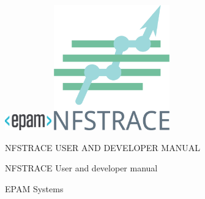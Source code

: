 \documentclass{article}
\begin{document}

\begin{titlepage}

\newcommand{\HRule}{\rule{\linewidth}{0.5mm}} %

\includegraphics[width=2cm]{pictures/epam-logo.png}
\newline
\center
\vspace{3cm}
\includegraphics[width=5cm]{pictures/logo.png}

\par\vspace{1cm}
\center
{\huge NFSTRACE USER AND DEVELOPER MANUAL}\\[0.4cm] %
{} 
\vfill 
\end{titlepage} 


\newpage

\vspace{5mm}
NFSTRACE User and developer manual 

\vspace{5mm}
EPAM Systems 
\end{document}
